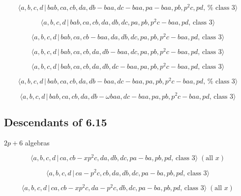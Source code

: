 \documentclass[10pt]{article}
\begin{document}
\begin{equation}
\langle a,b,c,d\,|\,bab,ca,cb,da,db-baa,dc-baa,pa-baa,pb,p^2c,pd,\,\text{%
class }3\rangle  \tag{7.3699}
\end{equation}

\begin{equation}
\langle a,b,c,d\,|\,bab,ca,cb,da,db,dc,pa,pb,p^2c-baa,pd,\,\text{class }%
3\rangle  \tag{7.3700}
\end{equation}

\begin{equation}
\langle a,b,c,d\,|\,bab,ca,cb-baa,da,db,dc,pa,pb,p^2c-baa,pd,\,\text{class }%
3\rangle  \tag{7.3701}
\end{equation}

\begin{equation}
\langle a,b,c,d\,|\,bab,ca,cb,da,db-baa,dc,pa,pb,p^2c-baa,pd,\,\text{class }%
3\rangle  \tag{7.3702}
\end{equation}

\begin{equation}
\langle a,b,c,d\,|\,bab,ca,cb,da,db,dc-baa,pa,pb,p^2c-baa,pd,\,\text{class }%
3\rangle  \tag{7.3703}
\end{equation}

\begin{equation}
\langle a,b,c,d\,|\,bab,ca,cb,da,db-baa,dc-baa,pa,pb,p^2c-baa,pd,\,\text{%
class }3\rangle  \tag{7.3704}
\end{equation}

\begin{equation}
\langle a,b,c,d\,|\,bab,ca,cb,da,db-\omega baa,dc-baa,pa,pb,p^{2}c-baa,pd,\,%
\text{class }3\rangle  \tag{7.3705}
\end{equation}

\subsection{Descendants of 6.15}

$2p+6$ algebras

\begin{equation}
\langle a,b,c,d\,|\,ca,cb-xp^2c,da,db,dc,pa-ba,pb,pd,\,\text{class }3\rangle
\;(\text{all }x)  \tag{7.3706}
\end{equation}

\begin{equation}
\langle a,b,c,d\,|\,ca-p^2c,cb,da,db,dc,pa-ba,pb,pd,\,\text{class }3\rangle 
\tag{7.3707}
\end{equation}

\begin{equation}
\langle a,b,c,d\,|\,ca,cb-xp^2c,da-p^2c,db,dc,pa-ba,pb,pd,\,\text{class }%
3\rangle \;(\text{all }x)  \tag{7.3708}
\end{equation}
\end{document}
